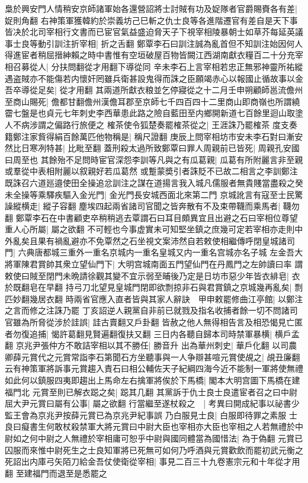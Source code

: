 梟於興安門人情稍安京師諸軍始各還營詔將士討賊有功及娖隊者官爵賜賚各有差|{
	娖則角翻}
右神策軍獲韓約於崇義坊己巳斬之仇士良等各進階遷官有差自是天下事皆决於北司宰相行文書而已宦官氣益盛迫脅天子下視宰相陵暴朝士如草芥每延英議事士良等動引訓注折宰相|{
	折之舌翻}
鄭覃李石曰訓注誠為亂首但不知訓注始因何人得進宦者稍屈搢紳賴之時中書惟有空垣破屋百物皆闕江西湖南獻衣糧百二十分充宰相召募從人|{
	分扶問翻從才用翻下導從同}
辛未李石上言宰相若忠正無邪神靈所祐縱遇盗賊亦不能傷若内懷奸罔雖兵衛甚設鬼得而誅之臣願竭赤心以報國止循故事以金吾卒導從足矣|{
	從才用翻}
其兩道所獻衣粮並乞停寢從之十二月壬申朔顧師邕流儋州至商山賜死|{
	儋都甘翻儋州漢儋耳郡至京師七千四百四十二里商山即商嶺也所謂繞霤七盤是也貞元七年刺史李西華患此路之險自藍田至内鄉開新道七百餘里迴山取塗人不病涉謂之偏路行旅便之}
榷茶使令狐楚奏罷榷茶從之|{
	王涯誅乃罷榷茶}
度支奏籍鄭注家貲得絹百餘萬匹他物稱是|{
	稱尺證翻}
庚辰上問宰相坊市安未李石對曰漸安然比日寒冽特甚|{
	比毗至翻}
蓋刑殺太過所致鄭覃曰罪人周親前已皆死|{
	周親孔安國曰周至也}
其餘殆不足問時宦官深怨李訓等凡與之有瓜葛親|{
	瓜葛有所附麗言非至親或羣從中表相附麗以叙親好若瓜葛然}
或蹔蒙奬引者誅貶不已故二相言之李訓鄭注既誅召六道廵邉使田全操追忿訓注之謀在道揚言我入城凡儒服者無貴賤當盡殺之癸未全操等乘驛疾驅入金光門|{
	金光門長安城西面北來第二門}
京城訛言有寇至士民驚譟縱横走|{
	縱子容翻}
塵埃四起兩省諸司官聞之皆奔散有不及束帶韈而乘馬者|{
	韈勿翻}
鄭覃李石在中書顧吏卒稍稍逃去覃謂石曰耳目頗異宜且出避之石曰宰相位尊望重人心所屬|{
	屬之欲翻}
不可輕也今事虚實未可知堅坐鎮之庶幾可定若宰相亦走則中外亂矣且果有禍亂避亦不免覃然之石坐視文案沛然自若敕使相繼傳呼閉皇城諸司門|{
	六典唐都城三重外一重名京城内一重名皇城又内一重名宫城亦名子城}
左金吾大將軍陳君賞帥其衆立望仙門下|{
	大明宫城南面五門望仙門在丹鳳門之左帥讀曰率}
謂敕使曰賊至閉門未晩請徐觀其變不宜示弱至晡後乃定是日坊市惡少年皆衣緋皂|{
	衣於既翻皂在早翻}
持弓刀北望見皇城門閉即欲剽掠非石與君賞鎮之京城幾再亂矣|{
	剽匹妙翻幾居衣翻}
時兩省官應入直者皆與其家人辭訣　甲申敕罷修曲江亭館|{
	以鄭注之言而修之注誅乃罷}
丁亥詔逆人親黨自非前已就戮及指名收捕者餘一切不問諸司官雖為所脅從涉於詿誤|{
	詿古賣翻又戶卦翻}
皆赦之他人無得相告言及相恐愒見亡匿者勿復追捕|{
	愒許葛翻見賢遍翻復扶又翻}
三日内各聽自歸本司時禁軍暴横|{
	横戶孟翻}
京兆尹張仲方不敢詰宰相以其不勝任|{
	勝音升}
出為華州刺史|{
	華戶化翻}
以司農卿薛元賞代之元賞常詣李石第聞石方坐聽事與一人争辯甚喧元賞使覘之|{
	覘丑廉翻}
云有神策軍將訴事元賞趨入責石曰相公輔佐天子紀綱四海今近不能制一軍將使無禮如此何以鎮服四夷即趨出上馬命左右擒軍將俟於下馬橋|{
	閣本大明宫圖下馬橋在建福門北}
元賞至則已解衣跽之矣|{
	跽其几翻}
其黨訴于仇士良士良遣宦者召之曰中尉屈大尹元賞曰屬有公事|{
	屬之欲翻}
行當繼至遂杖殺之　|{
	考異曰開成紀事以祕書少監王會為京兆尹按薛元賞已為京兆尹紀事誤}
乃白服見士良|{
	白服即待罪之素服}
士良曰癡書生何敢杖殺禁軍大將元賞曰中尉大臣也宰相亦大臣也宰相之人若無禮於中尉如之何中尉之人無禮於宰相庸可恕乎中尉與國同體當為國惜法|{
	為于偽翻}
元賞已囚服而來惟中尉死生之士良知軍將已死無可如何乃呼酒與元賞歡飲而罷初武元衡之死詔出内庫弓矢陌刀給金吾仗使衛從宰相|{
	事見二百三十九卷憲宗元和十年從才用翻}
至建福門而退至是悉罷之

